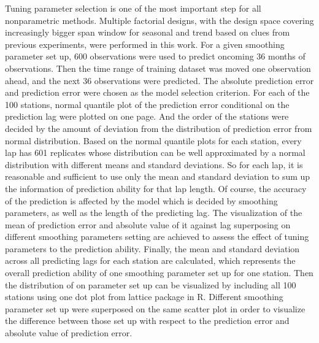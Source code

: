 Tuning parameter selection is one of the most important step for all nonparametric methods.
Multiple factorial designs, with the design space covering increasingly bigger span window for 
seasonal and trend based on clues from previous experiments, were performed in this work. For a 
given smoothing parameter set up, 600 observations were used to predict oncoming 36 months of 
observations. Then the time range of training dataset was moved one observation ahead, and the 
next 36 observations were predicted. The absolute prediction error and prediction error were chosen 
as the model selection criterion. For each of the 100 stations, normal quantile plot of the 
prediction error conditional on the prediction lag were plotted on one page. And the order of the 
stations were decided by the amount of deviation from the distribution of prediction error from 
normal distribution. Based on the normal quantile plots for each station, every lap has 601 
replicates whose distribution can be well approximated by a normal distribution with different means
and standard deviations. So for each lap, it is reasonable and sufficient to use only the mean and 
standard deviation to sum up the information of prediction ability for that lap length. Of course, 
the accuracy of the prediction is affected by the model which is decided by smoothing parameters, as 
well as the length of the predicting lag. The visualization of the mean of prediction error and 
absolute value of it against lag superposing on different smoothing parameters setting are achieved 
to assess the effect of tuning parameters to the prediction ability.
Finally, the mean and standard deviation across all predicting lags for each station are calculated,
which represents the overall prediction ability of one smoothing parameter set up for one station. 
Then the distribution of on parameter set up can be visualized by including all 100 stations using 
one dot plot from lattice package in R. Different smoothing parameter set up were superposed on the 
same scatter plot in order to visualize the difference between those set up with respect to the
prediction error and absolute value of prediction error.

